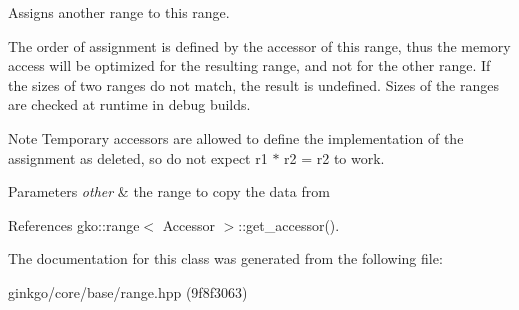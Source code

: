 Assigns another range to this range. 

The order of assignment is defined by the accessor of this range, thus the memory access will be optimized for the resulting range, and not for the other range. If the sizes of two ranges do not match, the result is undefined. Sizes of the ranges are checked at runtime in debug builds.

\begin{DoxyNote}{Note}
Temporary accessors are allowed to define the implementation of the assignment as deleted, so do not expect {\ttfamily r1 $\ast$ r2 = r2} to work.
\end{DoxyNote}

\begin{DoxyParams}{Parameters}
{\em other} & the range to copy the data from \\
\hline
\end{DoxyParams}


References gko\+::range$<$ Accessor $>$\+::get\+\_\+accessor().



The documentation for this class was generated from the following file\+:\begin{DoxyCompactItemize}
\item 
ginkgo/core/base/range.\+hpp (9f8f3063)\end{DoxyCompactItemize}
